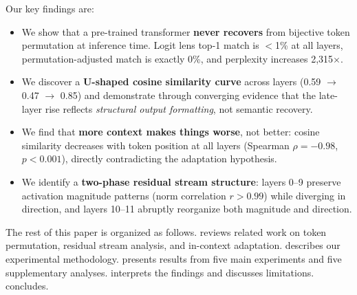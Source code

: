 Our key findings are:
\begin{itemize}[leftmargin=*,itemsep=0pt,topsep=0pt]
    \item We show that a pre-trained transformer \textbf{never recovers} from bijective token permutation at inference time. Logit lens top-1 match is $<$1\% at all layers, permutation-adjusted match is exactly 0\%, and perplexity increases 2,315$\times$.
    \item We discover a \textbf{U-shaped cosine similarity curve} across layers (0.59 $\to$ 0.47 $\to$ 0.85) and demonstrate through converging evidence that the late-layer rise reflects \emph{structural output formatting}, not semantic recovery.
    \item We find that \textbf{more context makes things worse}, not better: cosine similarity decreases with token position at all layers (Spearman $\rho = -0.98$, $p < 0.001$), directly contradicting the adaptation hypothesis.
    \item We identify a \textbf{two-phase residual stream structure}: layers 0--9 preserve activation magnitude patterns (norm correlation $r > 0.99$) while diverging in direction, and layers 10--11 abruptly reorganize both magnitude and direction.
\end{itemize}

The rest of this paper is organized as follows.  reviews related work on token permutation, residual stream analysis, and in-context adaptation.  describes our experimental methodology.  presents results from five main experiments and five supplementary analyses.  interprets the findings and discusses limitations.  concludes.
